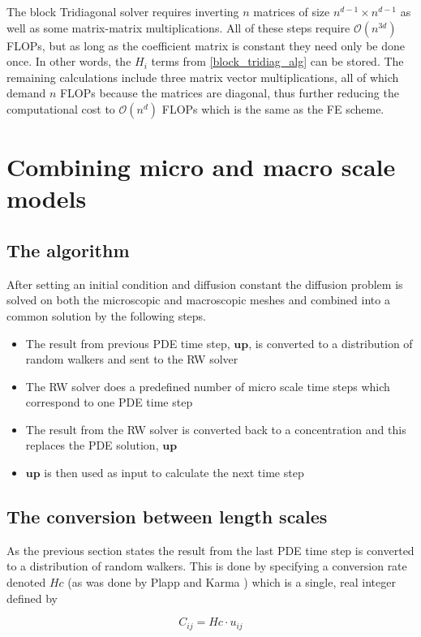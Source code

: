 The block Tridiagonal solver requires inverting $n$ matrices of size $n^{d-1}\times n^{d-1}$ as well as some matrix-matrix multiplications. 
All of these steps require $\mathcal O(n^{3d})$ FLOPs, but as long as the coefficient matrix is constant they need only be done once. 
In other words, the $H_i$ terms from \eqref{block_tridiag_alg} can be stored. 
The remaining calculations include three matrix vector multiplications, all of which demand $n$ FLOPs because the matrices are diagonal, thus further reducing the computational cost to $\mathcal{O}(n^d)$ FLOPs which is the same as the FE scheme.

\section{Combining micro and macro scale models}

\subsection{The algorithm}
After setting an initial condition and diffusion constant the diffusion problem is solved on both the microscopic and macroscopic meshes and combined into a common solution by the following steps.
\begin{itemize}
 \item The result from previous PDE time step, $\mathbf{up}$, is converted to a distribution of random walkers and sent to the RW solver
 \item The RW solver does a predefined number of micro scale time steps which correspond to one PDE time step
 \item The result from the RW solver is converted back to a concentration and this replaces the PDE solution, $\mathbf{up}$
 \item $\mathbf{up}$ is then used as input to calculate the next time step
\end{itemize}

\subsection{The conversion between length scales}
As the previous section states the result from the last PDE time step is converted to a distribution of random walkers. 
This is done by specifying a conversion rate denoted $Hc$ (as was done by Plapp and Karma \cite{plapp2000multiscale}) which is a single, real integer defined by

\begin{equation}\label{theory:Hc_definition}
 C_{ij} = Hc\cdot u_{ij}
\end{equation}

